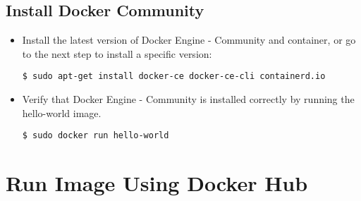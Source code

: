 \subsection{Install Docker Community}
\begin{itemize}
	
\item Install the latest version of Docker Engine - Community and container, or go to the next step to install a specific version:
\begin{verbatim}
$ sudo apt-get install docker-ce docker-ce-cli containerd.io
\end{verbatim}

\item Verify that Docker Engine - Community is installed correctly by running the hello-world image.
\begin{verbatim}
$ sudo docker run hello-world
\end{verbatim}
	
\end{itemize}


\section{Run Image Using Docker Hub}	

